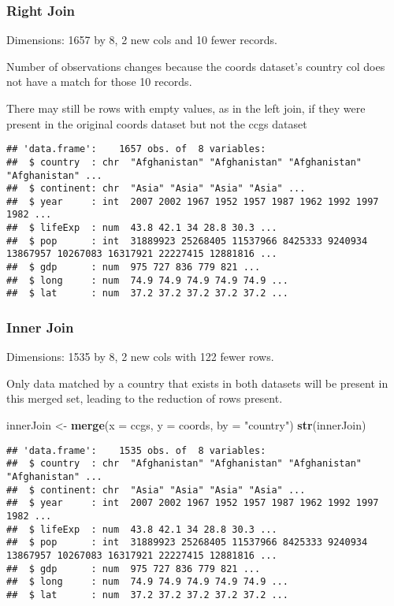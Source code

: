 \documentclass[
]{article}
\newenvironment{Shaded}{\begin{snugshade}}{\end{snugshade}}
\newcommand{\DataTypeTok}[1]{\textcolor[rgb]{0.13,0.29,0.53}{#1}}
\newcommand{\KeywordTok}[1]{\textcolor[rgb]{0.13,0.29,0.53}{\textbf{#1}}}
\newcommand{\NormalTok}[1]{#1}
\newcommand{\StringTok}[1]{\textcolor[rgb]{0.31,0.60,0.02}{#1}}
\begin{document}
\hypertarget{right-join}{%
\subsubsection{Right Join}\label{right-join}}

Dimensions: 1657 by 8, 2 new cols and 10 fewer records.

Number of observations changes because the coords dataset's country col
does not have a match for those 10 records.

There may still be rows with empty values, as in the left join, if they
were present in the original coords dataset but not the ccgs dataset

\begin{verbatim}
## 'data.frame':    1657 obs. of  8 variables:
##  $ country  : chr  "Afghanistan" "Afghanistan" "Afghanistan" "Afghanistan" ...
##  $ continent: chr  "Asia" "Asia" "Asia" "Asia" ...
##  $ year     : int  2007 2002 1967 1952 1957 1987 1962 1992 1997 1982 ...
##  $ lifeExp  : num  43.8 42.1 34 28.8 30.3 ...
##  $ pop      : int  31889923 25268405 11537966 8425333 9240934 13867957 10267083 16317921 22227415 12881816 ...
##  $ gdp      : num  975 727 836 779 821 ...
##  $ long     : num  74.9 74.9 74.9 74.9 74.9 ...
##  $ lat      : num  37.2 37.2 37.2 37.2 37.2 ...
\end{verbatim}

\hypertarget{inner-join}{%
\subsubsection{Inner Join}\label{inner-join}}

Dimensions: 1535 by 8, 2 new cols with 122 fewer rows.

Only data matched by a country that exists in both datasets will be
present in this merged set, leading to the reduction of rows present.

\begin{Shaded}
\begin{Highlighting}[]
\NormalTok{innerJoin <-}\StringTok{  }\KeywordTok{merge}\NormalTok{(}\DataTypeTok{x =}\NormalTok{ ccgs, }\DataTypeTok{y =}\NormalTok{ coords, }\DataTypeTok{by =} \StringTok{"country"}\NormalTok{)}
\KeywordTok{str}\NormalTok{(innerJoin)}
\end{Highlighting}
\end{Shaded}

\begin{verbatim}
## 'data.frame':    1535 obs. of  8 variables:
##  $ country  : chr  "Afghanistan" "Afghanistan" "Afghanistan" "Afghanistan" ...
##  $ continent: chr  "Asia" "Asia" "Asia" "Asia" ...
##  $ year     : int  2007 2002 1967 1952 1957 1987 1962 1992 1997 1982 ...
##  $ lifeExp  : num  43.8 42.1 34 28.8 30.3 ...
##  $ pop      : int  31889923 25268405 11537966 8425333 9240934 13867957 10267083 16317921 22227415 12881816 ...
##  $ gdp      : num  975 727 836 779 821 ...
##  $ long     : num  74.9 74.9 74.9 74.9 74.9 ...
##  $ lat      : num  37.2 37.2 37.2 37.2 37.2 ...
\end{verbatim}
\end{document}
